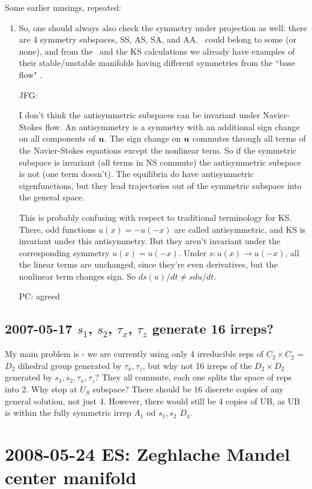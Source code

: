 Some earlier musings, repeated:
\begin{enumerate}
  \item So, one should always also check the symmetry under
       projection as well: there are 4 symmetry
      subspaces, SS, AS, SA, and AA. \Eqva\ could belong to some (or
      none), and from the \ubranch\ and the KS calculations we
      already have examples of their stable/unstable manifolds having
      different symmetries from the ``base flow" \eqv.

JFG:{ I don't think the antisymmetric subspaces can be invariant
under Navier-Stokes flow. An antisymmetry is a symmetry with an
additional sign change on all components of ${\bf u}$. The sign change on
${\bf u}$ commutes through all terms of the Navier-Stokes equations
except the nonlinear term. So if the symmetric subspace is invariant
(all terms in NS commute) the antisymmetric subspace is not (one term
doesn't). The equilibria do have antisymmetric eigenfunctions, but
they lead trajectories out of the symmetric subspace into the general
space.

  This is probably confusing with respect to traditional terminology
for KS. There, odd functions $u(x) = -u(-x)$ are called
antisymmetric, and KS is invariant under this antisymmetry. But they
aren't invariant under the corresponding symmetry $u(x) = u(-x)$.
Under $s : u(x) \to u(-x)$, all the linear terms are unchanged, since
they're even derivatives, but the nonlinear term changes sign. So $d
s(u)/dt \neq s du/dt$.


PC: agreed }
\end{enumerate}

\subsection{2007-05-17 $s_1$, $s_2$, $\tau_x$, $\tau_z$ generate 16
irreps?}

\medskip{}
 My main problem is - we are currently using only 4 irreducible reps
of $C_2 \times C_2$ = $D_2$ dihedral group generated by $\tau_x, \tau_z$,
but why not 16 irreps of
the $D_2 \times D_2$ generated by $s_1, s_2, \tau_x, \tau_z$?
They all commute, each one splits the space of reps into 2.
Why stop at $U_S$ subspace?
There should be 16 discrete copies of any
general solution, not just 4.
However, there would still be 4 copies of UB, as UB is within the
fully symmetric irrep $A_1$ od $s_1, s_2$ $D_4$.

\section{2008-05-24 ES: Zeghlache Mandel center manifold}

